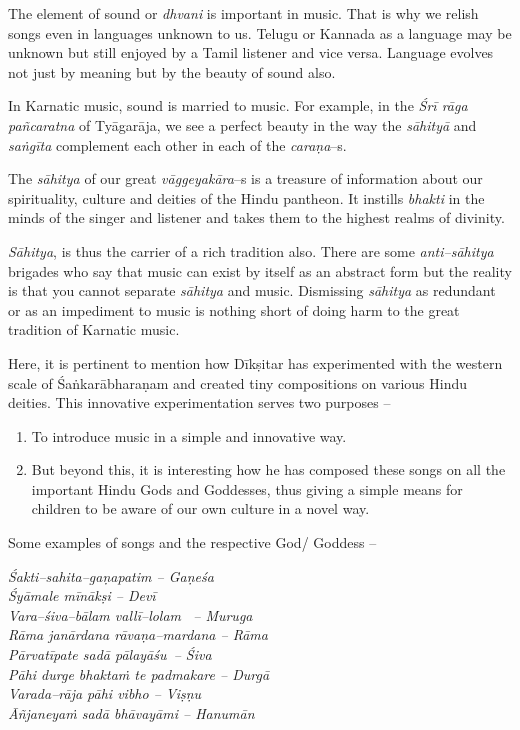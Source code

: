  \item The element of sound or \textit{dhvani} is important in music. That is why we relish songs even in languages unknown to us. Telugu or Kannada as a language may be unknown but still enjoyed by a Tamil listener and vice versa. Language evolves not just by meaning but by the beauty of sound also. 

 \item In Karnatic music, sound is married to music. For example, in the \textit{Śrī rāga pañcaratna} of Tyāgarāja, we see a perfect beauty in the way the \textit{sāhityā} and \textit{saṅgīta} complement each other in each of the \textit{caraṇa}–s.

 \item The \textit{sāhitya} of our great \textit{vāggeyakāra}–s is a treasure of information about our spirituality, culture and deities of the Hindu pantheon. It instills \textit{bhakti} in the minds of the singer and listener and takes them to the highest realms of divinity.

\textit{Sāhitya}, is thus the carrier of a rich tradition also. There are some \textit{anti–sāhitya} brigades who say that music can exist by itself as an abstract form but the reality is that you cannot separate \textit{sāhitya} and music. Dismissing \textit{sāhitya} as redundant or as an impediment to music is nothing short of doing harm to the great tradition of Karnatic music.

Here, it is pertinent to mention how Dīkṣitar has experimented with the western scale of Śaṅkarābharaṇam and created tiny compositions on various Hindu deities. This innovative experimentation serves two purposes –

\begin{enumerate}
\item To introduce music in a simple and innovative way.

 \item But beyond this, it is interesting how he has composed these songs on all the important Hindu Gods and Goddesses, thus giving a simple means for children to be aware of our own culture in a novel way.

\end{enumerate}

Some examples of songs and the respective God/ Goddess –

\textit{Śakti–sahita–gaṇapatim – Gaṇeśa} \\\textit{Śyāmale mīnākṣi – Devī}\\\textit{Vara–śiva–bālam vallī–lolam  – Muruga}\\\textit{Rāma janārdana rāvaṇa–mardana – Rāma} \\\textit{Pārvatīpate sadā pālayāśu – Śiva}\\\textit{Pāhi durge bhaktaṁ te padmakare – Durgā} \\\textit{Varada–rāja pāhi vibho – Viṣṇu}\\\textit{Āñjaneyaṁ sadā bhāvayāmi – Hanumān}


